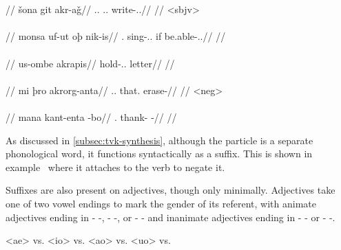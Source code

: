 	\begingl
		\glpreamble{}\\
		\\
		//
		\gla šona git akr-aǧ//
		\glb \Tpp.\An.\Top{} \Tps.\In.\Acc{} write-\Ind.\Pst.\Rtsp//
		\glft{}//
	\endgl
	\a<sbjv>\begingl
		\glpreamble{}\\
		\\
		//
		\gla monsa uf-ut oþ nik-is//
		\glb \Fpc.\Top{} sing-\Ind.\Npst.\Pfv{} if be.able-\Sbjv.\Npst.\Ipfv//
		\glft{}//
	\endgl
	\a<iii:pptcp>\begingl
		\glpreamble{}\\
		\\
		//
		\gla us-ombe akrapis//
		\glb hold-\Pass.\Ptcp.\In{} letter//
		\glft{}//
	\endgl
	\a<i:imp>\begingl
		\glpreamble{}\\
		\\
		//
		\gla mi þro akrorg-anta//
		\glb \In.\Sg.\Top{} that.\Med{} erase-\Imp//
		\glft{}//
	\endgl
	\a<neg>\begingl
		\glpreamble{}\\
		\\
		//
		\gla mana kant-enta -bo//
		\glb \Fpp.\Top{} thank-\Imp{} -\Neg//
		\glft{}//
	\endgl
\xe

As discussed in \autoref{subsec:tvk-synthesis}, although the particle   is a separate phonological word, it functions syntactically as a suffix. This is shown in example~ where it attaches to the verb   to negate it.

Suffixes are also present on adjectives, though only minimally. Adjectives take one of two vowel endings to mark the gender of its referent, with animate adjectives ending in - -, - -, or - - and inanimate adjectives ending in - - or - -.

	\a<ae>   \gloss{\An} vs.    \gloss{\In} 
	\a<io>   \gloss{\An} vs.    \gloss{\In} 
	\a<ao>   \gloss{\An} vs.    \gloss{\In} 
	\a<uo>   \gloss{\An} vs.    \gloss{\In} 
\xe

